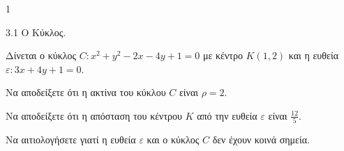 \begin{ylh}{1}
    \item 3.1 Ο Κύκλος.
\end{ylh}
Δίνεται ο κύκλος $C: x^2 + y^2 - 2x - 4y + 1 = 0$ με κέντρο $K(1,2)$ και η ευθεία $\varepsilon: 3x+4y+1=0$.
\begin{alist}
\item Να αποδείξετε ότι η ακτίνα του κύκλου $C$ είναι $\rho = 2$. 
\item Να αποδείξετε ότι η απόσταση του κέντρου $K$ από την ευθεία $\varepsilon$ είναι $\frac{12}{5}$. 
\item Να αιτιολογήσετε γιατί η ευθεία $\varepsilon$ και ο κύκλος $C$ δεν έχουν κοινά σημεία. 
\end{alist}